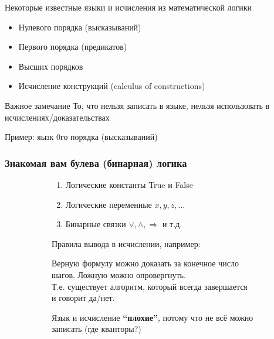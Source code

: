 \begin{frame}{Некоторые известные языки и исчисления из математической логики}
\begin{itemize}
  \item Нулевого порядка (высказываний)
  \item Первого порядка (предикатов)
  \item Высших порядков
  \item Исчисление конструкций (calculus of constructions)
\end{itemize}
\begin{block}{Важное замечание}
  То, что нельзя записать в языке, нельзя использовать в исчислениях/доказательствах
\end{block}
\end{frame}

\begin{frame}{Пример: яызк 0го порядка (высказываний) }
\frametitle{Знакомая вам булева (бинарная) логика}
\begin{figure}[t]
  \begin{subfigure}[t]{0.45\textwidth}
\begin{enumerate}
  \item Логические константы True и False
  \item Логические переменные $x,y,z,\dots$
  \item Бинарные связки $\vee, \wedge, \Rightarrow$ и т.д.
\end{enumerate}
\vspace{2em}
Правила вывода в исчислении, например:
\begin{mathpar}
\end{mathpar}
  \end{subfigure}
\hspace{0.05\textwidth}
  \begin{subfigure}[t]{0.46\textwidth}
\begin{theorem}
  Верную формулу можно доказать за конечное число шагов. Ложную можно опровергнуть.\\

  Т.е. существует алгоритм, который всегда завершается и говорит да/нет.
\end{theorem}
\vspace{2em}
Язык и исчисление \textbf{``плохие''}, потому что не всё можно записать (где кванторы?)
  \end{subfigure}
\end{figure}


\end{frame}


